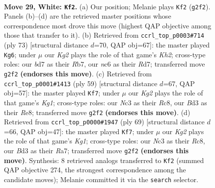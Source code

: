 \documentclass[11pt]{article}
\begin{document}
\clearpage

\begin{figure}[p]\centering
\begin{subfigure}{0.46\textwidth}\centering
\resizebox{\linewidth}{!}{%
\newchessgame
\chessboard[
  setfen={r7/3bk3/1pn1p3/p3P3/P5r1/1PNB2P1/6K1/R2R4 w - - 1 29},
  showmover=false,
  pgfstyle=straightmove, color=movearrow, markmove={g2-f2}
]}
\caption{}
\end{subfigure}\hfill
\begin{subfigure}{0.46\textwidth}\centering
\resizebox{\linewidth}{!}{%
\newchessgame
\chessboard[
  setfen={R7/1r1rbp1k/1p2p2p/pR2P3/3P3p/2B2P2/3P2PK/8 b - - 4 37},
  showmover=false,
  pgfstyle=straightmove, color=movearrow, markmove={h7-g6}
]}
\caption{}
\end{subfigure}
\\[4pt]
\begin{subfigure}{0.46\textwidth}\centering
\resizebox{\linewidth}{!}{%
\newchessgame
\chessboard[
  setfen={2r1r1k1/6b1/6p1/p1p4p/2Rp1B2/1P4PP/P4PK1/3R4 b - - 1 30},
  showmover=false,
  pgfstyle=straightmove, color=movearrow, markmove={g8-f7}
]}
\caption{}
\end{subfigure}\hfill
\begin{subfigure}{0.46\textwidth}\centering
\resizebox{\linewidth}{!}{%
\newchessgame
\chessboard[
  setfen={2r3k1/r3n1p1/2p2p1p/2R4P/p2R4/P5P1/5PK1/2B5 b - - 0 35},
  showmover=false,
  pgfstyle=straightmove, color=movearrow, markmove={g8-f7}
]}
\caption{}
\end{subfigure}
\caption{\textbf{Move 29, White: \texttt{Kf2}.} (a) Our position; Melanie plays \texttt{Kf2} (\texttt{g2f2}). Panels (b)--(d) are the retrieved master positions whose correspondence most drove this move (highest QAP objective among those that transfer to it). (b) Retrieved from \texttt{ccrl\_top\_p0003\#714} (ply 73) [structural distance $d$=70, QAP obj=67]: the master played \texttt{Kg6}; under $\mu$ our \emph{Kg2} plays the role of that game's \emph{Kh2}; cross-type roles: our \emph{b}d7 as their \emph{R}b7, our \emph{n}c6 as their \emph{R}d7; transferred move \texttt{g2f2} \textbf{(endorses this move)}. (c) Retrieved from \texttt{ccrl\_top\_p0001\#1413} (ply 59) [structural distance $d$=67, QAP obj=57]: the master played \texttt{Kf7}; under $\mu$ our \emph{Kg2} plays the role of that game's \emph{Kg1}; cross-type roles: our \emph{N}c3 as their \emph{R}c8, our \emph{B}d3 as their \emph{R}e8; transferred move \texttt{g2f2} \textbf{(endorses this move)}. (d) Retrieved from \texttt{ccrl\_top\_p0000\#1947} (ply 69) [structural distance $d$=66, QAP obj=47]: the master played \texttt{Kf7}; under $\mu$ our \emph{Kg2} plays the role of that game's \emph{Kg1}; cross-type roles: our \emph{N}c3 as their \emph{R}c8, our \emph{B}d3 as their \emph{R}a7; transferred move \texttt{g2f2} \textbf{(endorses this move)}. Synthesis: 8 retrieved analogs transferred to \texttt{Kf2} (summed QAP objective 274, the strongest correspondence among the candidate moves); Melanie committed it via the \texttt{search} selector.}
\label{fig:thought-m56}
\end{figure}
\end{document}
